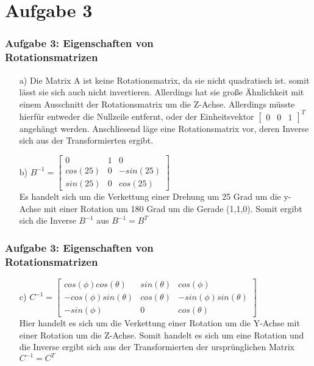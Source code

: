 \documentclass[accentcolor=tud9c,colorbacktitle,inverttitle,landscape,german,presentation,t]{tudbeamer}
\begin{document}
	\section{Aufgabe 3}
	\begin{frame}
		\frametitle{Aufgabe 3: Eigenschaften von \\ Rotationsmatrizen} 
		\begin{itemize}
			\item[a)] Die Matrix A ist keine Rotationsmatrix, da sie nicht quadratisch ist. somit lässt sie sich auch nicht invertieren. Allerdings hat sie große Ähnlichkeit mit einem Ausschnitt der Rotationsmatrix um die Z-Achse. Allerdings müsste hierfür entweder die Nullzeile entfernt, oder der Einheitsvektor $\begin{bmatrix} 0 & 0 & 1\end{bmatrix}^T$angehängt werden. Anschliesend läge eine Rotationsmatrix vor, deren Inverse sich aus der Transformierten ergibt.%
			\item[b)] $B^{-1}=\begin{bmatrix}
			0 & 1 & 0\\
			cos(25) & 0 & -sin(25)\\
			sin(25) & 0 & cos(25)
			\end{bmatrix} $ \\
			Es handelt sich um die Verkettung einer Drehung um 25 Grad um die y-Achse mit einer Rotation um 180 Grad um die Gerade (1,1,0). Somit ergibt sich die Inverse $B^{-1}$ aus $B^{-1}=B^{T} $
		\end{itemize}
	\end{frame}
	
	\begin{frame}
		\frametitle{Aufgabe 3: Eigenschaften von \\ Rotationsmatrizen} 
		\begin{itemize}
			\item[c)] $C^{-1}=\begin{bmatrix}
			cos(\phi)cos(\theta) & sin(\theta) & cos(\phi)\\
			-cos(\phi)sin(\theta) & cos(\theta) & -sin(\phi)sin(\theta) \\
			-sin(\phi) & 0 & cos(\theta) 
			\end{bmatrix} $ \\
			Hier handelt es sich um die Verkettung einer Rotation um die Y-Achse mit einer Rotation um die Z-Achse. Somit handelt es sich um eine Rotation und die Inverse ergibt sich aus der Transformierten der ursprünglichen Matrix $C^{-1}=C^T$
		\end{itemize}
	\end{frame}
\end{document}
